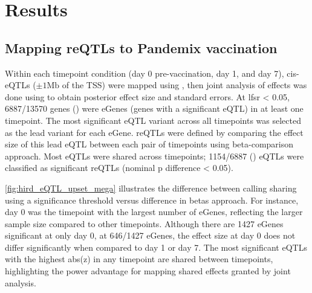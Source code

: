 
\section{Results}

\subsection{Mapping reQTLs to Pandemix vaccination}

Within each timepoint condition (day 0 pre-vaccination, day 1, and day 7), cis-\glspl{eQTL} ($\pm 1 \text{Mb}$ of the \gls{TSS}) were mapped using ,
then joint analysis of effects was done using  to obtain posterior effect size and standard errors.
At \gls{lfsr} < 0.05, 6887/13570 genes () were eGenes (genes with a significant \gls{eQTL}) in at least one timepoint.
The most significant \gls{eQTL} variant across all timepoints was selected as the lead variant for each eGene.
\glspl{reQTL} were defined by comparing the effect size of this lead \gls{eQTL} between each pair of timepoints using beta-comparison approach.
Most \glspl{eQTL} were shared across timepoints; 1154/6887 () \glspl{eQTL} were classified as significant \glspl{reQTL} (nominal p difference < 0.05).

\autoref{fig:hird_eQTL_upset_mega} illustrates the difference between calling sharing using a significance threshold versus difference in betas approach.
For instance, day 0 was the timepoint with the largest number of eGenes, reflecting the larger sample size compared to other timepoints.
Although there are 1427 eGenes significant at only day 0, at 646/1427 eGenes, the effect size at day 0 does not differ significantly when compared to day 1 or day 7.
The most significant \glspl{eQTL} with the highest abs(z) in any timepoint are shared between timepoints, highlighting the power advantage for mapping shared effects granted by joint analysis.

